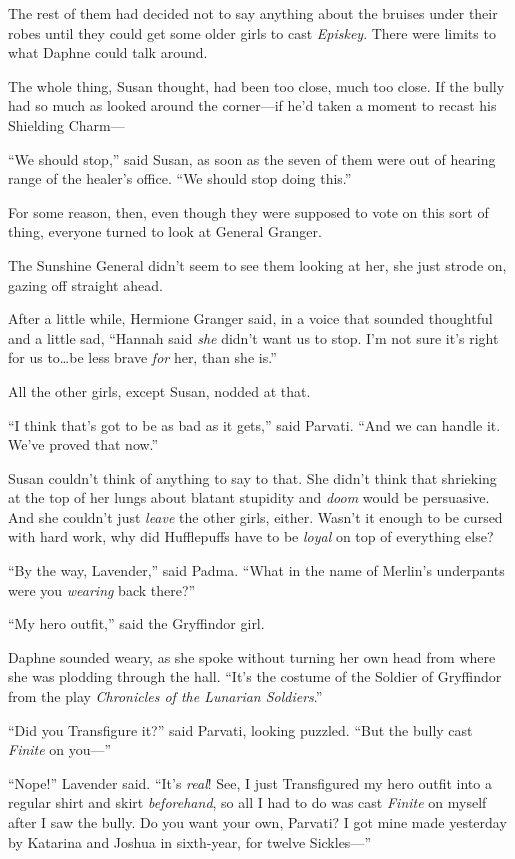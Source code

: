 The rest of them had decided not to say anything about the bruises under their robes until they could get some older girls to cast \emph{Episkey}. There were limits to what Daphne could talk around.

The whole thing, Susan thought, had been too close, much too close. If the bully had so much as looked around the corner—if he’d taken a moment to recast his Shielding Charm—

“We should stop,” said Susan, as soon as the seven of them were out of hearing range of the healer’s office. “We should stop doing this.”

For some reason, then, even though they were supposed to vote on this sort of thing, everyone turned to look at General Granger.

The Sunshine General didn’t seem to see them looking at her, she just strode on, gazing off straight ahead.

After a little while, Hermione Granger said, in a voice that sounded thoughtful and a little sad, “Hannah said \emph{she} didn’t want us to stop. I’m not sure it’s right for us to…be less brave \emph{for} her, than she is.”

All the other girls, except Susan, nodded at that.

“I think that’s got to be as bad as it gets,” said Parvati. “And we can handle it. We’ve proved that now.”

Susan couldn’t think of anything to say to that. She didn’t think that shrieking at the top of her lungs about blatant stupidity and \emph{doom} would be persuasive. And she couldn’t just \emph{leave} the other girls, either. Wasn’t it enough to be cursed with hard work, why did Hufflepuffs have to be \emph{loyal} on top of everything else?

“By the way, Lavender,” said Padma. “What in the name of Merlin’s underpants were you \emph{wearing} back there?”

“My hero outfit,” said the Gryffindor girl.

Daphne sounded weary, as she spoke without turning her own head from where she was plodding through the hall. “It’s the costume of the Soldier of Gryffindor from the play \emph{Chronicles of the Lunarian Soldiers}.”

“Did you Transfigure it?” said Parvati, looking puzzled. “But the bully cast \emph{Finite} on you—”

“Nope!” Lavender said. “It’s \emph{real}! See, I just Transfigured my hero outfit into a regular shirt and skirt \emph{beforehand}, so all I had to do was cast \emph{Finite} on myself after I saw the bully. Do you want your own, Parvati? I got mine made yesterday by Katarina and Joshua in sixth-year, for twelve Sickles—”

